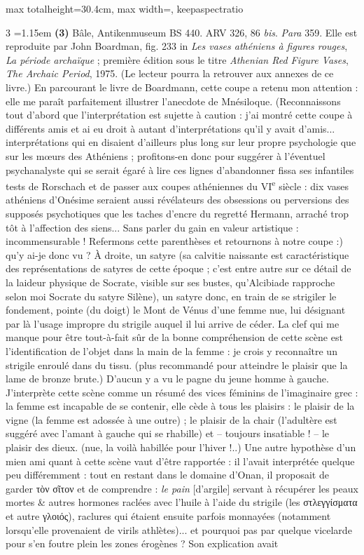 \documentclass[11pt,twoside]{book}
\newcommand{\italique}[1]{\textit{#1}}
\newcommand{\nieme}[1]{#1\textsuperscript{e}}
\begin{document}
\begin{adjustbox}{max totalheight=30.4cm, max width=\textwidth, keepaspectratio}
\begin{minipage}{\textwidth}
{\begin{multicols}{3}
\noindent\hangindent=1.15em {\color{sepiaNote}\textbf{(3)}} Bâle, Antikenmuseum BS 440. ARV 326, 86 \italique{bis}. \italique{Para} 359. Elle est reproduite par John Boardman, fig. 233 in \italique{Les vases athéniens à figures rouges}, \italique{La période archaïque} ; première édition sous le titre \italique{Athenian Red Figure Vases}, \italique{The Archaic Period}, 1975. (Le lecteur pourra la retrouver aux annexes de ce livre.) En parcourant le livre de Boardmann, cette coupe a retenu mon attention : elle me paraît parfaitement illustrer l'anecdote de Mnésiloque. (Reconnaissons tout d'abord que l'interprétation est sujette à caution : j'ai montré cette coupe à différents amis et ai eu droit à autant d'interprétations qu'il y avait d'amis... interprétations qui en disaient d'ailleurs plus long sur leur propre psychologie que sur les mœurs des Athéniens ; profitons-en donc pour suggérer à l'éventuel psychanalyste qui se serait égaré à lire ces lignes d'abandonner fissa ses infantiles tests de Rorschach et de passer aux coupes athéniennes du \nieme{VI} siècle : dix vases athéniens d'Onésime seraient aussi révélateurs des obsessions ou perversions des supposés psychotiques que les taches d'encre du regretté Hermann, arraché trop tôt à l'affection des siens... Sans parler du gain en valeur artistique : incommensurable ! Refermons cette parenthèses et retournons à notre coupe :) qu'y ai-je donc vu ? À droite, un satyre (sa calvitie naissante est caractéristique des représentations de satyres de cette époque ; c'est entre autre sur ce détail de la laideur physique de Socrate, visible sur ses bustes, qu'Alcibiade rapproche selon moi Socrate du satyre Silène), un satyre donc, en train de se strigiler le fondement, pointe (du doigt) le Mont de Vénus d'une femme nue, lui désignant par là l'usage impropre du strigile auquel il lui arrive de céder. La clef qui me manque pour être tout-à-fait sûr de la bonne compréhension de cette scène est l'identification de l'objet dans la main de la femme : je crois y reconnaître un strigile enroulé dans du tissu. (plus recommandé pour atteindre le plaisir que la lame de bronze brute.) D'aucun y a vu le pagne du jeune homme à gauche. J'interprète cette scène comme un résumé des vices féminins de l'imaginaire grec : la femme est incapable de se contenir, elle cède à tous les plaisirs : le plaisir de la vigne (la femme est adossée à une outre) ; le plaisir de la chair (l'adultère est suggéré avec l'amant à gauche qui se rhabille) et -- toujours insatiable ! -- le plaisir des dieux. (nue, la voilà habillée pour l'hiver !..) Une autre hypothèse d'un mien ami quant à cette scène vaut d'être rapportée : il l'avait interprétée quelque peu différemment : tout en restant dans le domaine d'Onan, il proposait de garder τὸν σῖτον et de comprendre : \italique{le pain} [d'argile] servant à récupérer les peaux mortes \& autres hormones raclées avec l'huile à l'aide du strigile (les στλεγγίσματα et autre γλοιός), raclures qui étaient ensuite parfois monnayées (notamment lorsqu'elle provenaient de virils athlètes)... et pourquoi pas par quelque vicelarde pour s'en foutre plein les zones érogènes ? Son explication avait 
\end{multicols}}
\end{minipage}
\end{adjustbox}
\end{document}
